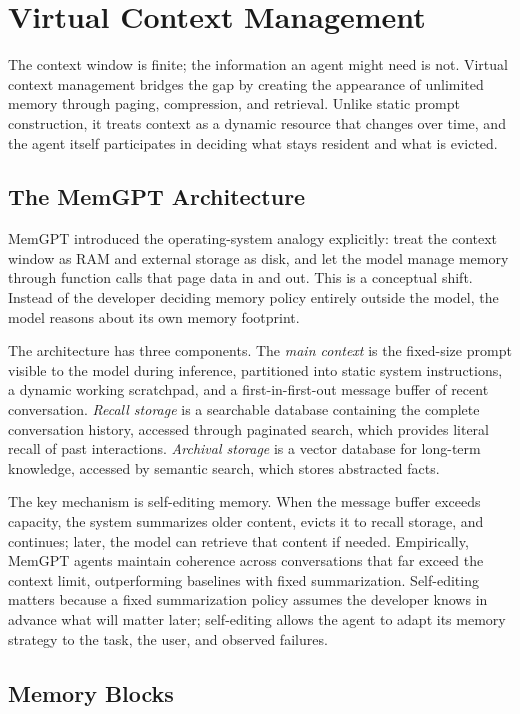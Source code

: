 \documentclass[11pt]{book}
\begin{document}
\section{Virtual Context Management}

The context window is finite; the information an agent might need is not. Virtual context management bridges the gap by creating the appearance of unlimited memory through paging, compression, and retrieval. Unlike static prompt construction, it treats context as a dynamic resource that changes over time, and the agent itself participates in deciding what stays resident and what is evicted.

\subsection{The MemGPT Architecture}

MemGPT \cite{packer2024memgpt} introduced the operating-system analogy explicitly: treat the context window as RAM and external storage as disk, and let the model manage memory through function calls that page data in and out. This is a conceptual shift. Instead of the developer deciding memory policy entirely outside the model, the model reasons about its own memory footprint.

The architecture has three components. The \textit{main context} is the fixed-size prompt visible to the model during inference, partitioned into static system instructions, a dynamic working scratchpad, and a first-in-first-out message buffer of recent conversation. \textit{Recall storage} is a searchable database containing the complete conversation history, accessed through paginated search, which provides literal recall of past interactions. \textit{Archival storage} is a vector database for long-term knowledge, accessed by semantic search, which stores abstracted facts.

The key mechanism is self-editing memory. When the message buffer exceeds capacity, the system summarizes older content, evicts it to recall storage, and continues; later, the model can retrieve that content if needed. Empirically, MemGPT agents maintain coherence across conversations that far exceed the context limit, outperforming baselines with fixed summarization. Self-editing matters because a fixed summarization policy assumes the developer knows in advance what will matter later; self-editing allows the agent to adapt its memory strategy to the task, the user, and observed failures.

\subsection{Memory Blocks}
\end{document}
